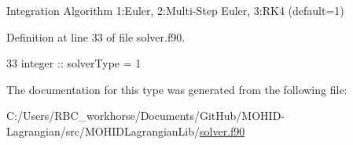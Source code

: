 Integration Algorithm 1\+:Euler, 2\+:Multi-\/\+Step Euler, 3\+:R\+K4 (default=1) 



Definition at line 33 of file solver.\+f90.


\begin{DoxyCode}
33         \textcolor{keywordtype}{integer} :: solverType = 1
\end{DoxyCode}


The documentation for this type was generated from the following file\+:\begin{DoxyCompactItemize}
\item 
C\+:/\+Users/\+R\+B\+C\+\_\+workhorse/\+Documents/\+Git\+Hub/\+M\+O\+H\+I\+D-\/\+Lagrangian/src/\+M\+O\+H\+I\+D\+Lagrangian\+Lib/\mbox{\hyperlink{solver_8f90}{solver.\+f90}}\end{DoxyCompactItemize}
